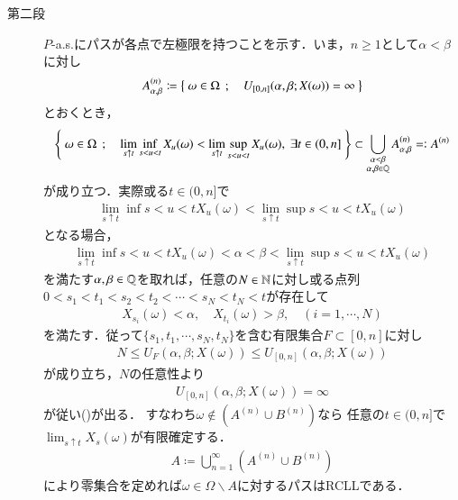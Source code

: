 \begin{prf}
\begin{description}
			\item[第二段]
				$P$-a.s.にパスが各点で左極限を持つことを示す．いま，$n \geq 1$として$\alpha < \beta$に対し
				\begin{align}
					A^{(n)}_{\alpha,\beta}
					\coloneqq \left\{\ \omega \in \Omega\ \, ; \quad U_{[0,n]}(\alpha,\beta;X(\omega)) = \infty\ \right\}
				\end{align}
				とおくとき，
				\begin{align}
					\left\{\ \omega \in \Omega\ \, ; \quad \lim_{s \uparrow t}\operatorname*{inf}_{s < u < t} X_u(\omega)
					< \lim_{s \uparrow t}\operatorname*{sup}_{s < u < t} X_u(\omega),\ \exists t \in (0,n]\ \right\}
					\subset \bigcup_{\substack{\alpha < \beta \\ \alpha,\beta \in \mathbb{Q}}}A^{(n)}_{\alpha,\beta}
					=\mathrel{\mathop:} A^{(n)}
					\label{eq:chapter_1_Theorem_3_8_v_1}
				\end{align}
				が成り立つ．実際或る$t \in (0,n]$で
				\begin{align}
					\lim_{s \uparrow t}\inf{s < u < t}{X_u(\omega)}
					< \lim_{s \uparrow t}\sup{s < u < t}{X_u(\omega)}
				\end{align}
				となる場合，
				\begin{align}
					\lim_{s \uparrow t}\inf{s < u < t}{X_u(\omega)}
					< \alpha < \beta < \lim_{s \uparrow t}\sup{s < u < t}{X_u(\omega)}
				\end{align}
				を満たす$\alpha,\beta \in \mathbb{Q}$を取れば，任意の$N \in \mathbb{N}$に対し或る点列
				$0 < s_1 < t_1 < s_2 < t_2 < \cdots < s_N < t_N < t$が存在して
				\begin{align}
					X_{s_i}(\omega) < \alpha,
					\quad X_{t_i}(\omega) > \beta,
					\quad (i=1,\cdots,N)
				\end{align}
				を満たす．従って$\{s_1,t_1,\cdots,s_N,t_N\}$を含む有限集合$F \subset [0,n]$に対し
				\begin{align}
					N \leq U_F(\alpha,\beta;X(\omega)) \leq U_{[0,n]}(\alpha,\beta;X(\omega))
				\end{align}
				が成り立ち，$N$の任意性より
				\begin{align}
					U_{[0,n]}(\alpha,\beta;X(\omega)) = \infty
				\end{align}
				が従い()が出る．
				すなわち$\omega \notin \left( A^{(n)} \cup B^{(n)} \right)$なら
				任意の$t \in (0,n]$で$\lim_{s \uparrow t} X_s(\omega)$が有限確定する．
				\begin{align}
					A \coloneqq \bigcup_{n=1}^\infty \left( A^{(n)} \cup B^{(n)} \right)
				\end{align}
				により零集合を定めれば$\omega \in \Omega \backslash A$に対するパスはRCLLである．
				\QED
		\end{description}
	\end{prf}
	
